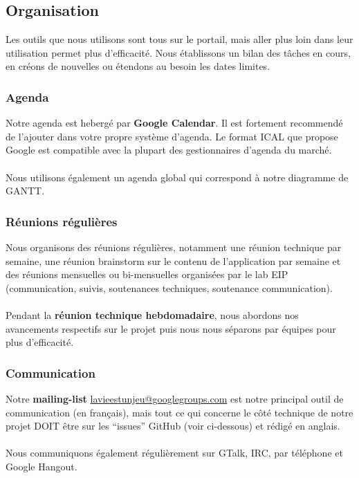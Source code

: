 \documentclass{life-fr}
\begin{document}
\subsection{Organisation}

Les outils que nous utilisons sont tous sur le portail, mais aller plus
loin dans leur utilisation permet plus d'efficacité. Nous établissons
un bilan des tâches en cours, en créons de nouvelles ou étendons au
besoin les dates limites.

\subsubsection{Agenda}

Notre agenda est hebergé par \textbf{Google Calendar}. Il est fortement
recommendé de l'ajouter dans votre propre système d'agenda. Le format
ICAL que propose Google est compatible avec la plupart des gestionnaires
d'agenda du marché.\\
\\
Nous utilisons également un agenda global qui correspond à notre
diagramme de GANTT.

\subsubsection{Réunions régulières}

Nous organisons des réunions régulières, notamment une réunion technique
par semaine, une réunion brainstorm sur le contenu de l'application par semaine et
des réunions mensuelles ou bi-mensuelles organisées par le lab EIP
(communication, suivis, soutenances techniques, soutenance communication).\\
\\
Pendant la \textbf{réunion technique hebdomadaire}, nous abordons nos
avancements respectifs sur le projet puis nous nous séparons par
équipes pour plus d'efficacité.

\subsubsection{Communication}

Notre \textbf{mailing-list} \href{mailto:lavieestunjeu@googlegroups.com}{lavieestunjeu@googlegroups.com}
est notre principal outil de communication (en français), mais tout
ce qui concerne le côté technique de notre projet DOIT être sur les
``issues'' GitHub (voir ci-dessous) et rédigé en anglais.\\
\\
Nous communiquons également régulièrement sur GTalk, IRC, par téléphone
et Google Hangout.
\end{document}
